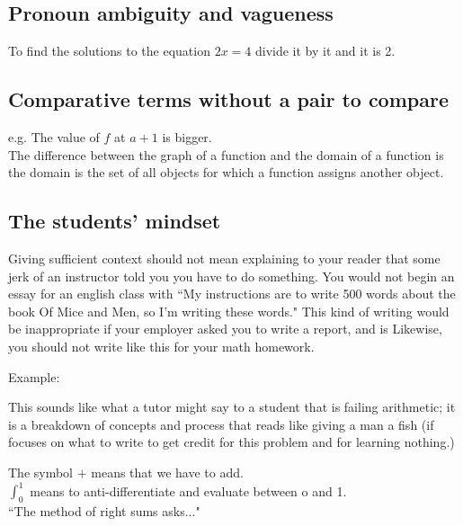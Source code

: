 \documentclass[12pt]{article}
\def\noi{\noindent}
\begin{document}
\subsection{Pronoun ambiguity and vagueness}
To find the solutions to the equation $2x=4$ divide it by it and it is 2.

\subsection{Comparative terms without a pair to compare}
e.g. The value of $f$ at $a+1$ is bigger.\\

\noi The difference between the graph of a function and the domain of a function is the domain is the set of all objects for which a function assigns another object.

\subsection{\bfseries The students' mindset}
Giving sufficient context should not mean explaining to your reader that some jerk of an instructor told you you have to do something. You would not begin an essay for an english class with ``My instructions are to write 500 words about the book Of Mice and Men, so I'm writing these words." 
This kind of writing would be inappropriate if your employer asked you to write a report, and is 
Likewise, you should not write like this for your math homework.

Example:\\
\begin{quote}
\end{quote}



This sounds like what a tutor might say to a student that is failing arithmetic; it is a breakdown of concepts and process that reads like 
giving a man a fish (if focuses on what to write to get credit for this problem and for learning nothing.)


The symbol $+$ means that we have to add. \\
$\int_0^1$ means to anti-differentiate and evaluate between o and 1. \\
``The method of right sums asks..."\\
\end{document}
